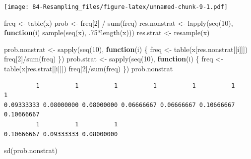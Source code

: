 \documentclass[
]{book}
\newenvironment{Shaded}{\begin{snugshade}}{\end{snugshade}}
\newcommand{\ControlFlowTok}[1]{\textcolor[rgb]{0.13,0.29,0.53}{\textbf{#1}}}
\newcommand{\DecValTok}[1]{\textcolor[rgb]{0.00,0.00,0.81}{#1}}
\newcommand{\FunctionTok}[1]{\textcolor[rgb]{0.00,0.00,0.00}{#1}}
\newcommand{\NormalTok}[1]{#1}
\newcommand{\OtherTok}[1]{\textcolor[rgb]{0.56,0.35,0.01}{#1}}
\newcommand{\SpecialCharTok}[1]{\textcolor[rgb]{0.00,0.00,0.00}{#1}}
\begin{document}
\texttt{[image: 84-Resampling\_files/figure-latex/unnamed-chunk-9-1.pdf]}

\begin{Shaded}
\begin{Highlighting}[]
\NormalTok{freq }\OtherTok{\textless{}{-}} \FunctionTok{table}\NormalTok{(x)}
\NormalTok{prob }\OtherTok{\textless{}{-}}\NormalTok{ freq[}\DecValTok{2}\NormalTok{] }\SpecialCharTok{/} \FunctionTok{sum}\NormalTok{(freq)}
\NormalTok{res.nonstrat }\OtherTok{\textless{}{-}} \FunctionTok{lapply}\NormalTok{(}\FunctionTok{seq}\NormalTok{(}\DecValTok{10}\NormalTok{), }\ControlFlowTok{function}\NormalTok{(i) }\FunctionTok{sample}\NormalTok{(}\FunctionTok{seq}\NormalTok{(x), .}\DecValTok{75}\SpecialCharTok{*}\FunctionTok{length}\NormalTok{(x)))}
\NormalTok{res.strat }\OtherTok{\textless{}{-}} \FunctionTok{resample}\NormalTok{(x)}
\end{Highlighting}
\end{Shaded}

\begin{Shaded}
\begin{Highlighting}[]
\NormalTok{prob.nonstrat }\OtherTok{\textless{}{-}} \FunctionTok{sapply}\NormalTok{(}\FunctionTok{seq}\NormalTok{(}\DecValTok{10}\NormalTok{), }\ControlFlowTok{function}\NormalTok{(i) \{}
\NormalTok{  freq }\OtherTok{\textless{}{-}} \FunctionTok{table}\NormalTok{(x[res.nonstrat[[i]]])}
\NormalTok{  freq[}\DecValTok{2}\NormalTok{]}\SpecialCharTok{/}\FunctionTok{sum}\NormalTok{(freq)}
\NormalTok{\})}
\NormalTok{prob.strat }\OtherTok{\textless{}{-}} \FunctionTok{sapply}\NormalTok{(}\FunctionTok{seq}\NormalTok{(}\DecValTok{10}\NormalTok{), }\ControlFlowTok{function}\NormalTok{(i) \{}
\NormalTok{  freq }\OtherTok{\textless{}{-}} \FunctionTok{table}\NormalTok{(x[res.strat[[i]]])}
\NormalTok{  freq[}\DecValTok{2}\NormalTok{]}\SpecialCharTok{/}\FunctionTok{sum}\NormalTok{(freq)}
\NormalTok{\})}
\NormalTok{prob.nonstrat}
\end{Highlighting}
\end{Shaded}

\begin{verbatim}
         1          1          1          1          1          1          1 
0.09333333 0.08000000 0.08000000 0.06666667 0.06666667 0.10666667 0.10666667 
         1          1          1 
0.10666667 0.09333333 0.08000000 
\end{verbatim}

\begin{Shaded}
\begin{Highlighting}[]
\FunctionTok{sd}\NormalTok{(prob.nonstrat)}
\end{Highlighting}
\end{Shaded}
\end{document}
